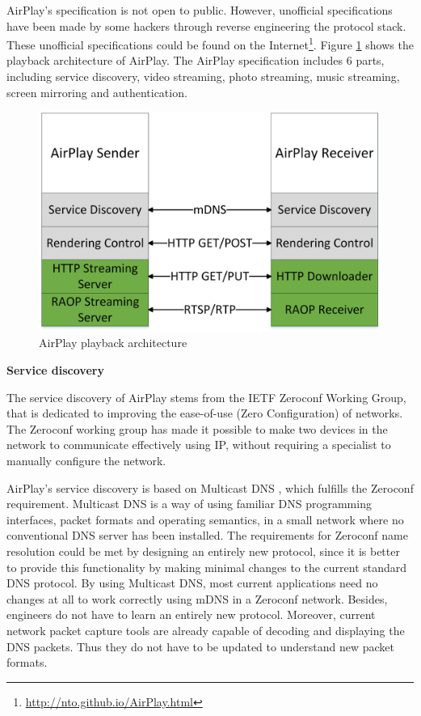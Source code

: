 AirPlay's specification is not open to public. However, unofficial
specifications have been made by some hackers through reverse engineering the
protocol stack. These unofficial specifications could be found on the
Internet\footnote{\url{http://nto.github.io/AirPlay.html}}.
Figure \ref{airplay_use_scenario} shows the playback architecture
of AirPlay. The AirPlay specification includes 6 parts, including service discovery, video
streaming, photo streaming, music streaming, screen mirroring and
authentication.
\clearpage
\begin{figure}[htb] 
\centering \includegraphics[width=0.7\columnwidth]{charts/airplay} 
\caption{AirPlay playback architecture\label{airplay_use_scenario}} 
\end{figure}  
\textbf{Service discovery}

The service discovery of AirPlay stems from the IETF Zeroconf Working Group, 
that is dedicated to improving the ease-of-use (Zero Configuration) of networks.
The Zeroconf working group has made it possible to make two devices in the 
network to communicate effectively using IP, without requiring a specialist to manually 
configure the network.

AirPlay's service discovery is based on Multicast DNS \cite{multicastdns}, which fulfills the
Zeroconf requirement. Multicast DNS is a way of using familiar DNS programming interfaces, packet formats and operating semantics, in a small 
network where no conventional DNS server has been installed. The requirements 
for Zeroconf name resolution could be met by designing an entirely new 
protocol, since it is better to provide this functionality by making minimal changes 
to the current standard DNS protocol. By using Multicast DNS, most current 
applications need no changes at all to work correctly using mDNS in a Zeroconf network. Besides,
engineers do not have to learn an entirely new protocol. Moreover, current network 
packet capture tools are already capable of  decoding and displaying the DNS packets. Thus they do not 
have to be updated to understand new packet formats.

